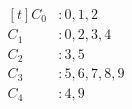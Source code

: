 \[
	\begin{aligned}[t]
		C_{0} &: 0, 1, 2 \\
		C_{1} &: 0, 2, 3, 4 \\
		C_{2} &: 3, 5 \\
		C_{3} &: 5, 6, 7, 8, 9 \\
		C_{4} &: 4, 9
	\end{aligned}
\]
